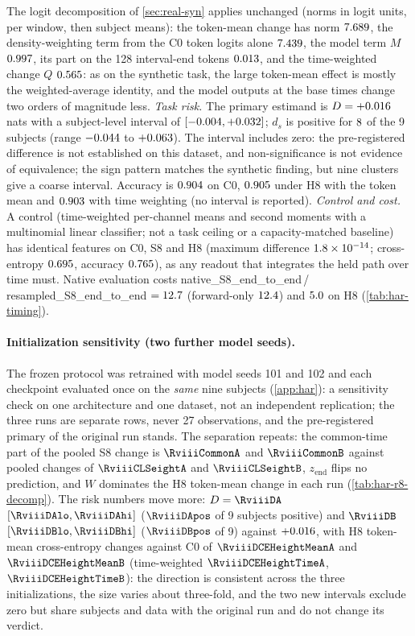 \documentclass{article}
\theoremstyle{plain}
\theoremstyle{definition}
\theoremstyle{remark}
\begin{document}
The logit decomposition of \cref{sec:real-syn} applies unchanged (norms in logit units, per window, then subject means): the token-mean change has norm $7.689$, the density-weighting term from the C0 token logits alone $7.439$, the model term $M$ $0.997$, its part on the 128 interval-end tokens $0.013$, and the time-weighted change $Q$ $0.565$: as on the synthetic task, the large token-mean effect is mostly the weighted-average identity, and the model outputs at the base times change two orders of magnitude less.
\emph{Task risk.}
The primary estimand is $D=+0.016$ nats with a subject-level interval of $[-0.004,+0.032]$; $d_s$ is positive for $8$ of the 9 subjects (range $-0.044$ to $+0.063$).
The interval includes zero: the pre-registered difference is not established on this dataset, and non-significance is not evidence of equivalence; the sign pattern matches the synthetic finding, but nine clusters give a coarse interval.
Accuracy is $0.904$ on C0, $0.905$ under H8 with the token mean and $0.903$ with time weighting (no interval is reported).
\emph{Control and cost.}
A control (time-weighted per-channel means and second moments with a multinomial linear classifier; not a task ceiling or a capacity-matched baseline) has identical features on C0, S8 and H8 (maximum difference $1.8\times10^{-14}$; cross-entropy $0.695$, accuracy $0.765$), as any readout that integrates the held path over time must.
Native evaluation costs native\_S8\_end\_to\_end\,/\,resampled\_S8\_end\_to\_end $=12.7$ (forward-only $12.4$) and $5.0$ on H8 (\cref{tab:har-timing}).

\paragraph{Initialization sensitivity (two further model seeds).}
The frozen protocol was retrained with model seeds 101 and 102 and each checkpoint evaluated once on the \emph{same} nine subjects (\cref{app:har}): a sensitivity check on one architecture and one dataset, not an independent replication; the three runs are separate rows, never 27 observations, and the pre-registered primary of the original run stands.
The separation repeats: the common-time part of the pooled S8 change is $\RviiiCommonA$ and $\RviiiCommonB$ against pooled changes of $\RviiiCLSeightA$ and $\RviiiCLSeightB$, $z_{\mathrm{end}}$ flips no prediction, and $W$ dominates the H8 token-mean change in each run (\cref{tab:har-r8-decomp}).
The risk numbers move more: $D=\RviiiDA$ $[\RviiiDAlo,\RviiiDAhi]$ ($\RviiiDApos$ of 9 subjects positive) and $\RviiiDB$ $[\RviiiDBlo,\RviiiDBhi]$ ($\RviiiDBpos$ of 9) against $+0.016$, with H8 token-mean cross-entropy changes against C0 of $\RviiiDCEHeightMeanA$ and $\RviiiDCEHeightMeanB$ (time-weighted $\RviiiDCEHeightTimeA$, $\RviiiDCEHeightTimeB$): the direction is consistent across the three initializations, the size varies about three-fold, and the two new intervals exclude zero but share subjects and data with the original run and do not change its verdict.
\end{document}
